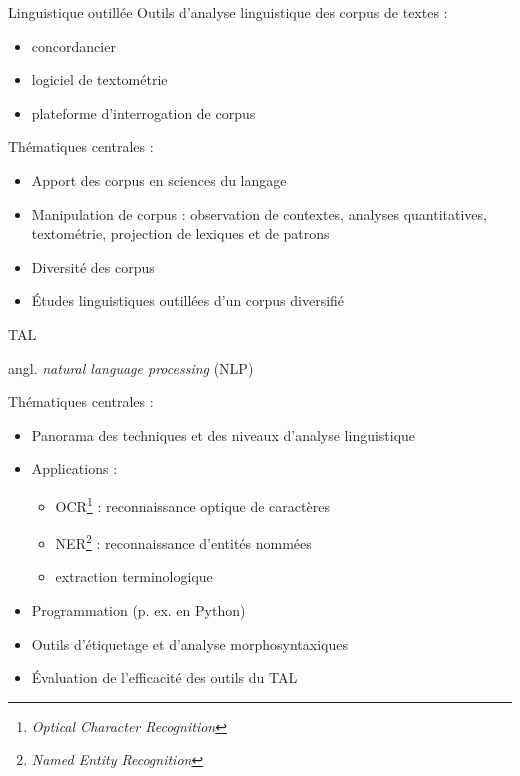 \documentclass[xetex,xcolor={table,usenames,dvipsnames}]{beamer}
\begin{document}
\begin{frame}{Linguistique outillée}
	Outils d'analyse linguistique des corpus de textes :
	        \begin{itemize}
			        	\item concordancier
			        	\item logiciel de textométrie
			        	\item plateforme d'interrogation de corpus
			        \end{itemize}
	Thématiques centrales :		        
			    \begin{itemize}
			    	\item Apport des corpus en sciences du langage
			    	\item Manipulation de corpus : observation de contextes, analyses quantitatives, textométrie, projection de lexiques et de patrons
			    	\item Diversité des corpus
			    	\item Études linguistiques outillées d’un corpus diversifié
			        \end{itemize}
			        
\end{frame}

\begin{frame}{\textsc{TAL}}
	
	{\scriptsize angl. \textit{natural language processing} (\textsc{NLP})}
	
	Thématiques centrales :
	\begin{itemize}
		\item Panorama des techniques et des niveaux d’analyse linguistique
		\item Applications :
		\begin{itemize}
			\item {\small\textsc{OCR}\footnote{\textit{Optical Character Recognition}}} : reconnaissance optique de caractères
			\item {\small\textsc{NER}\footnote{\textit{Named Entity Recognition}}} : reconnaissance d'entités nommées
			\item {\small extraction terminologique}
		\end{itemize}
		\item Programmation (p. ex. en Python)
		\item Outils d'étiquetage et d'analyse morphosyntaxiques 
		\item Évaluation de l’efficacité des outils du \textsc{TAL}
	\end{itemize}
\end{frame}
\end{document}
